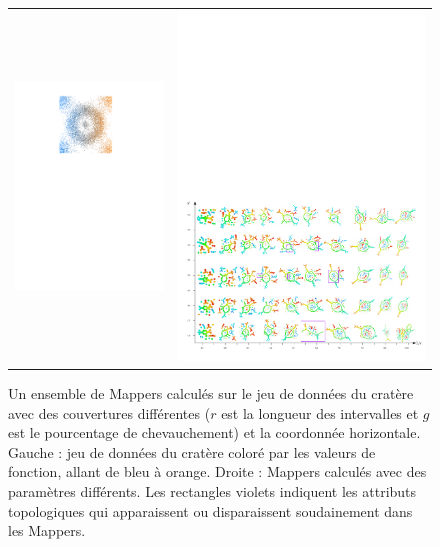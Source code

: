\begin{figure}
\begin{tabular}{cc}
\includegraphics[width=6cm]{figures/crater_instab} & \includegraphics[width=10cm]{figures/instab}
\end{tabular}
\caption[Instabilit\'e de Mappers calcul\'es avec des couvertures proches ]{\label{fig:instabilite}
Un ensemble de Mappers calcul\'es sur le jeu de donn\'ees du crat\`ere avec des couvertures diff\'erentes ($r$ est la longueur des intervalles et $g$
est le pourcentage de chevauchement) et la coordonn\'ee horizontale. Gauche : jeu de donn\'ees du crat\`ere color\'e par les valeurs
de fonction, allant de bleu \`a orange. Droite : Mappers calcul\'es avec des param\`etres diff\'erents.
Les rectangles violets indiquent les attributs topologiques qui apparaissent ou disparaissent soudainement dans les Mappers.}
\end{figure}


